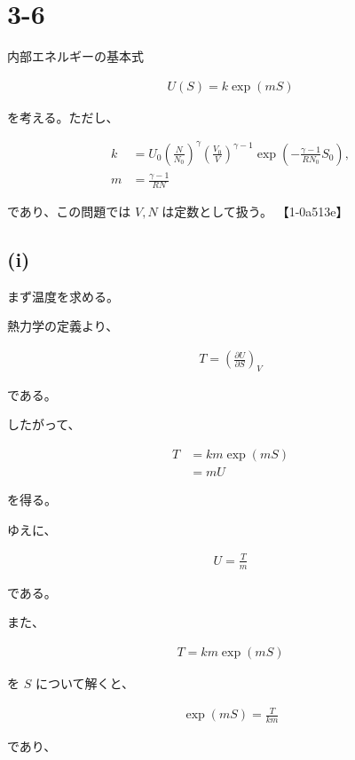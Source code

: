 \documentclass[platex,dvipdfmx,a4paper]{jsarticle}
\begin{document}
\section{3-6}

内部エネルギーの基本式

\begin{align*}
U(S)
=
k\exp(mS)
\end{align*}

を考える。ただし、

\begin{align*}
k
&=
U_0
\left(
\frac{N}{N_0}
\right)^\gamma
\left(
\frac{V_0}{V}
\right)^{\gamma-1}
\exp\left(
-\frac{\gamma-1}{RN_0}S_0
\right),
\\
m
&=
\frac{\gamma-1}{RN}
\end{align*}

であり、この問題では $V,N$ は定数として扱う。 【1-0a513e】

\subsection{(i)}

まず温度を求める。

熱力学の定義より、

\begin{align*}
T
=
\left(
\frac{\partial U}{\partial S}
\right)_V
\end{align*}

である。

したがって、

\begin{align*}
T
&=
km\exp(mS)
\\
&=
mU
\end{align*}

を得る。

ゆえに、

\begin{align*}
U
=
\frac{T}{m}
\end{align*}

である。

また、

\begin{align*}
T
=
km\exp(mS)
\end{align*}

を $S$ について解くと、

\begin{align*}
\exp(mS)
=
\frac{T}{km}
\end{align*}

であり、
\end{document}
